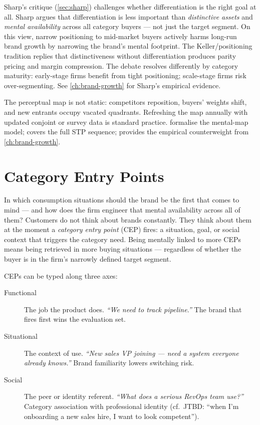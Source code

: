 Sharp's critique (\cref{sec:sharp}) challenges whether differentiation is the right goal at all. Sharp argues that differentiation is less important than \emph{distinctive assets} and \emph{mental availability} across all category buyers --- not just the target segment. On this view, narrow positioning to mid-market buyers actively harms long-run brand growth by narrowing the brand's mental footprint. The Keller/positioning tradition replies that distinctiveness without differentiation produces parity pricing and margin compression. The debate resolves differently by category maturity: early-stage firms benefit from tight positioning; scale-stage firms risk over-segmenting. See \cref{ch:brand-growth} for Sharp's empirical evidence.

The perceptual map is not static: competitors reposition, buyers' weights shift, and new entrants occupy vacated quadrants. Refreshing the map annually with updated conjoint or survey data is standard practice. \textcite{ries2001} formalise the mental-map model; \textcite{kotler2021} covers the full STP sequence; \textcite{sharp2010} provides the empirical counterweight from \cref{ch:brand-growth}.

\section{Category Entry Points}\label{sec:jtbd}

In which consumption situations should the brand be the first that comes to mind --- and how does the firm engineer that mental availability across all of them? Customers do not think about brands constantly. They think about them at the moment a \emph{category entry point} (CEP) fires: a situation, goal, or social context that triggers the category need. Being mentally linked to more CEPs means being retrieved in more buying situations --- regardless of whether the buyer is in the firm's narrowly defined target segment.

CEPs can be typed along three axes:

\begin{description}
  \item[Functional] The job the product does. \emph{``We need to track pipeline.''} The brand that fires first wins the evaluation set.
  \item[Situational] The context of use. \emph{``New sales VP joining --- need a system everyone already knows.''} Brand familiarity lowers switching risk.
  \item[Social] The peer or identity referent. \emph{``What does a serious RevOps team use?''} Category association with professional identity (cf.\ JTBD: ``when I'm onboarding a new sales hire, I want to look competent'').
\end{description}

